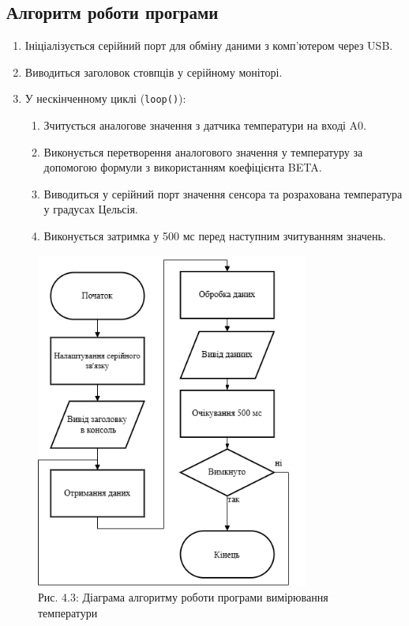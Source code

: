 \documentclass[a4paper]{article}
\begin{document}
\subsection*{Алгоритм роботи програми}
\begin{enumerate}
    \item Ініціалізується серійний порт для обміну даними з комп'ютером через USB.
    \item Виводиться заголовок стовпців у серійному моніторі.
    \item У нескінченному циклі (\texttt{loop()}):
    \begin{enumerate}
        \item Зчитується аналогове значення з датчика температури на вході A0.
        \item Виконується перетворення аналогового значення у температуру за допомогою формули з використанням коефіцієнта BETA.
        \item Виводиться у серійний порт значення сенсора та розрахована температура у градусах Цельсія.
        \item Виконується затримка у 500 мс перед наступним зчитуванням значень.
    \end{enumerate}
\end{enumerate}

\begin{figure}[h]
    \centering
    \includegraphics[width=0.8\textwidth]{imgs/LW4.01.drawio.png}
    \caption*{Рис. 4.3: Діаграма алгоритму роботи програми вимірювання температури}
\end{figure} 
\end{document}
